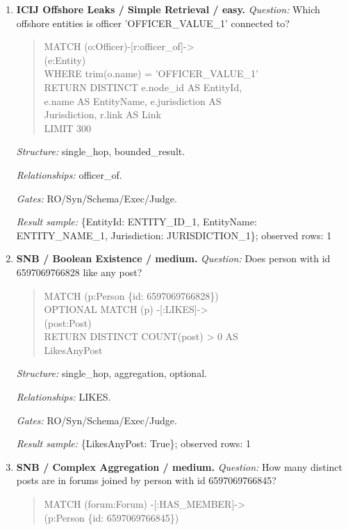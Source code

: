\begin{enumerate}
\textit{Result sample:} \{OffshoreEntityCount: 1\}; observed rows: 1
\item \textbf{ICIJ Offshore Leaks / Simple Retrieval / easy.}
\textit{Question:} Which offshore entities is officer 'OFFICER\_VALUE\_1' connected to?
\begin{quote}\scriptsize\ttfamily\raggedright\sloppy
MATCH (o:Officer)-[r:officer\_of]-\textgreater{}\\
(e:Entity)\\
WHERE trim(o.name) = 'OFFICER\_VALUE\_1'\\
RETURN DISTINCT e.node\_id AS EntityId,\\
e.name AS EntityName, e.jurisdiction AS\\
Jurisdiction, r.link AS Link\\
LIMIT 300
\end{quote}
\textit{Structure:} single\_hop, bounded\_result.\par
\textit{Relationships:} officer\_of.\par
\textit{Gates:} RO/Syn/Schema/Exec/Judge.\par
\textit{Result sample:} \{EntityId: ENTITY\_ID\_1, EntityName: ENTITY\_NAME\_1, Jurisdiction: JURISDICTION\_1\}; observed rows: 1
\item \textbf{SNB / Boolean Existence / medium.}
\textit{Question:} Does person with id 6597069766828 like any post?
\begin{quote}\scriptsize\ttfamily\raggedright\sloppy
MATCH (p:Person \{id: 6597069766828\})\\
OPTIONAL MATCH (p) -[:LIKES]-\textgreater{}\\
(post:Post)\\
RETURN DISTINCT COUNT(post) \textgreater{} 0 AS\\
LikesAnyPost
\end{quote}
\textit{Structure:} single\_hop, aggregation, optional.\par
\textit{Relationships:} LIKES.\par
\textit{Gates:} RO/Syn/Schema/Exec/Judge.\par
\textit{Result sample:} \{LikesAnyPost: True\}; observed rows: 1
\item \textbf{SNB / Complex Aggregation / medium.}
\textit{Question:} How many distinct posts are in forums joined by person with id 6597069766845?
\begin{quote}\scriptsize\ttfamily\raggedright\sloppy
MATCH (forum:Forum) -[:HAS\_MEMBER]-\textgreater{}\\
(p:Person \{id: 6597069766845\})\\

\end{quote}
\end{enumerate}
